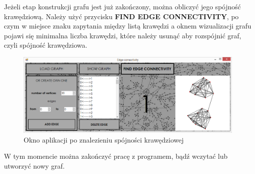 \documentclass{article}
\begin{document}
Jeżeli etap konstrukcji grafu jest już zakończony, można obliczyć jego spójność krawędziową. Należy użyć przycisku \textbf{FIND EDGE CONNECTIVITY}, po czym w miejsce znaku zapytania między listą krawędzi a oknem wizualizacji grafu pojawi się minimalna liczba krawędzi, które należy usunąć aby rozspójnić graf, czyli spójność krawędziowa.
 
\begin{figure}[H]
\centering
\includegraphics[scale=0.4]{04}
\caption{Okno aplikacji po znalezieniu spójności krawędziowej}
\end{figure}

W tym momencie można zakończyć pracę z programem, bądź wczytać lub utworzyć nowy graf.
\end{document}
